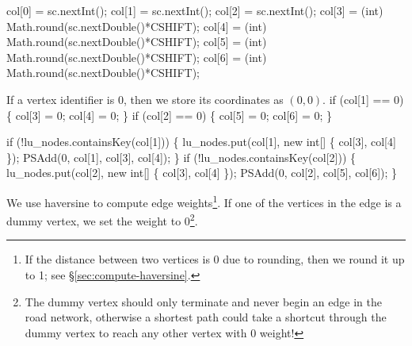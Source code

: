 \documentclass{article}
\def\nwendcode{\endtrivlist \endgroup}
\let\nwdocspar=\par
\theoremstyle{definition}
\begin{document}
\nwenddocs{}\endmoddef{}
col[0] = sc.nextInt();
col[1] = sc.nextInt();
col[2] = sc.nextInt();
col[3] = (int) Math.round(sc.nextDouble()*CSHIFT);
col[4] = (int) Math.round(sc.nextDouble()*CSHIFT);
col[5] = (int) Math.round(sc.nextDouble()*CSHIFT);
col[6] = (int) Math.round(sc.nextDouble()*CSHIFT);
\nwendcode{}\nwdocspar
If a vertex identifier is $0$, then we store its coordinates as $(0,0)$.
\nwenddocs{}\endmoddef{}
if (col[1] == 0) \{
  col[3] = 0;
  col[4] = 0;
\}
if (col[2] == 0) \{
  col[5] = 0;
  col[6] = 0;
\}
\nwendcode{}\nwdocspar
\nwenddocs{}\endmoddef{}
if (!lu_nodes.containsKey(col[1])) \{
  lu_nodes.put(col[1], new int[] \{ col[3], col[4] \});
  PSAdd(0, col[1], col[3], col[4]);
\}
if (!lu_nodes.containsKey(col[2])) \{
  lu_nodes.put(col[2], new int[] \{ col[3], col[4] \});
  PSAdd(0, col[2], col[5], col[6]);
\}
\nwendcode{}\nwdocspar
We use haversine to compute edge weights\footnote{If the distance between two
vertices is 0 due to rounding, then we round it up to 1; see
\S\ref{sec:compute-haversine}.}.  If one of the vertices in the edge is a dummy
vertex, we set the weight to 0\footnote{The dummy vertex should only terminate
and never begin an edge in the road network, otherwise a shortest path could
take a shortcut through the dummy vertex to reach any other vertex with 0
weight!}.
\nwenddocs{}\endmoddef{}
\end{document}
